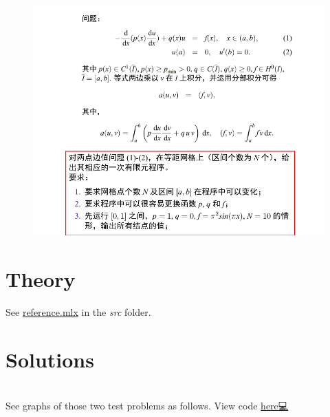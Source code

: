 \documentclass[a4paper,english]{article}
\begin{document}
	\begin{figure}[!hb]
		\centering
		\includegraphics[width=0.7\linewidth]{img/problem}
		\caption*{}
		\label{fig:problem}
	\end{figure}
	
	\section{Theory }
	See 
	\href{https://github.com/How-u-doing/Numerical_Analysis/blob/master/Chapter10_BVPforODEs/reference.mlx}{reference.mlx}
	in the \emph{src} folder.
	
	\section{Solutions}
	
	🔑 🔑 🔑 \\[5pt]	
	See graphs of those two test problems as follows. View code 
	\hyperref[PLRR_test]{here💻}	
	
\end{document}
